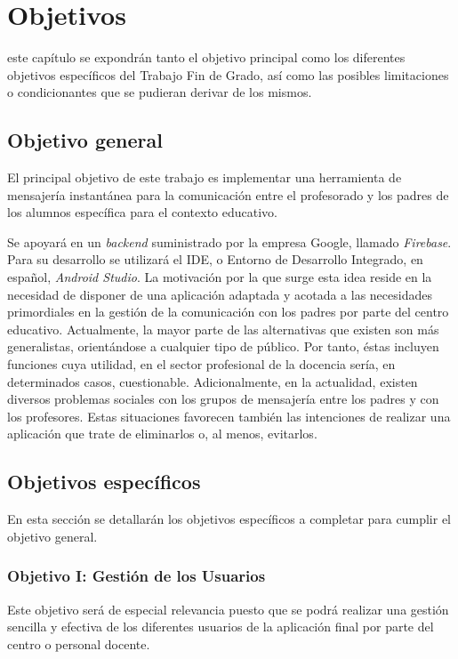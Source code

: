 \chapter{Objetivos}
\label{chap:objetivos}

\noindent

 este capítulo se expondrán tanto el objetivo principal como los diferentes objetivos específicos del Trabajo Fin de Grado, así como las posibles limitaciones o condicionantes que se pudieran derivar de los mismos.

\section{Objetivo general}
El principal objetivo de este trabajo es implementar una herramienta de mensajería instantánea para la comunicación entre el profesorado y los padres de los alumnos específica para el contexto educativo.

Se apoyará en un \textit{backend} suministrado por la empresa Google, llamado \textit{Firebase}. Para su desarrollo se utilizará el \acf{IDE}, o Entorno de Desarrollo Integrado, en español, \textit{Android Studio}. La motivación por la que surge esta idea reside en la necesidad de disponer de una aplicación adaptada y acotada a las necesidades primordiales en la gestión de la comunicación con los padres por parte del centro educativo. Actualmente, la mayor parte de las alternativas que existen son más generalistas, orientándose a cualquier tipo de público. Por tanto, éstas incluyen funciones cuya utilidad, en el sector profesional de la docencia sería, en determinados casos, cuestionable. Adicionalmente, en la actualidad, existen diversos problemas sociales con los grupos de mensajería entre los padres y con los profesores. Estas situaciones favorecen también las intenciones de realizar una aplicación que trate de eliminarlos o, al menos, evitarlos.

\section{Objetivos específicos}
En esta sección se detallarán los objetivos específicos a completar para cumplir el objetivo general.

\subsection{Objetivo I: Gestión de los Usuarios}
Este objetivo será de especial relevancia puesto que se podrá realizar una gestión sencilla y efectiva de los diferentes usuarios de la aplicación final por parte del centro o personal docente.

